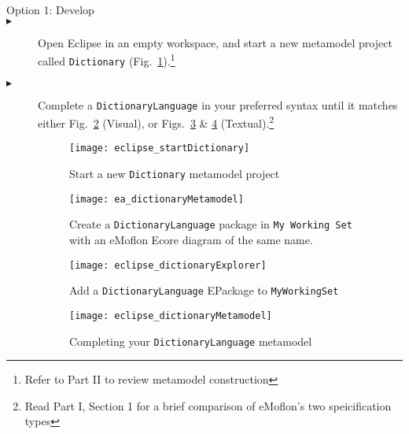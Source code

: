 \begin{description}
\item[Option 1: Develop] 


\item[$\blacktriangleright$] \hspace{0.3cm} Open Eclipse in an empty workspace, and start a new metamodel project called \texttt{Dict\-ion\-ary}
(Fig.~\ref{eclipse:startMetamodel}).\footnote{Refer to Part II to review metamodel construction} 


\item[$\blacktriangleright$] \hspace{0.3cm} Complete a \texttt{DictionaryLanguage} in your preferred syntax until it matches either Fig.~\ref{ea:dictLang}
(Visual), or Figs.~\ref{eclipse:dictLang} \& \ref{eclipse:dictLangMetamodel} (Textual).\footnote{Read Part I, Section 1 for a brief comparison of eMoflon's two
speicification types}


\begin{figure}[htbp]
\begin{center}
  \texttt{[image: eclipse\_startDictionary]}
  \caption{Start a new \texttt{Dictionary} metamodel project}
  \label{eclipse:startMetamodel}
\end{center}
\end{figure}


\begin{figure}[htbp]
  \hspace{-1cm}
  \texttt{[image: ea\_dictionaryMetamodel]}
  \caption{Create a \texttt{DictionaryLanguage} package in \texttt{My Working Set} with an eMoflon Ecore diagram of the same name.}
  \label{ea:dictLang}
\end{figure}

\newpage

\begin{figure}[htbp]
\begin{center}
  \texttt{[image: eclipse\_dictionaryExplorer]}
  \caption{Add a \texttt{DictionaryLanguage} EPackage to \texttt{MyWorkingSet}}
  \label{eclipse:dictLang}
\end{center}
\end{figure}

\vspace{0.5cm}

\begin{figure}[h!]
  \hspace{-1cm}
  \texttt{[image: eclipse\_dictionaryMetamodel]}
  \caption{Completing your \texttt{DictionaryLanguage} metamodel}
  \label{eclipse:dictLangMetamodel}
\end{figure}


\end{description}
